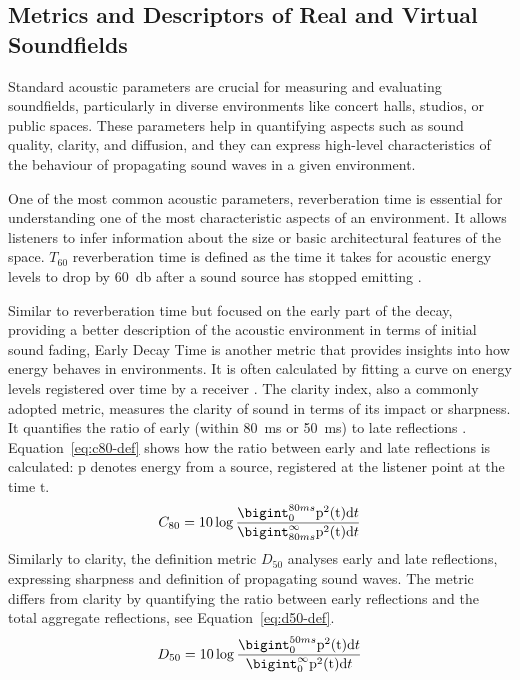 \subsection{Metrics and Descriptors of Real and Virtual Soundfields}
Standard acoustic parameters are crucial for measuring and evaluating soundfields, particularly in diverse environments like concert halls, studios, or public spaces. These parameters help in quantifying aspects such as sound quality, clarity, and diffusion, and they can express high-level characteristics of the behaviour of propagating sound waves in a given environment.\par
One of the most common acoustic parameters, reverberation time is essential for understanding one of the most characteristic aspects of an environment. It allows listeners to infer information about the size or basic architectural features of the space. $T_{60}$ reverberation time is defined as the time it takes for acoustic energy levels to drop by \qty{60}{\decibel} after a sound source has stopped emitting \citep{eckhardt1923acoustics}.\par
Similar to reverberation time but focused on the early part of the decay, providing a better description of the acoustic environment in terms of initial sound fading, Early Decay Time is another metric that provides insights into how energy behaves in environments. It is often calculated by fitting a curve on energy levels registered over time by a receiver \citep{jordan1970acoustical}.
The clarity index, also a commonly adopted metric, measures the clarity of sound in terms of its impact or sharpness.  It quantifies the ratio of early (within \qty{80}{\ms} or \qty{50}{\ms}) to late reflections \citep{reichardt1975definition}. Equation~\ref{eq:c80-def} shows how the ratio between early and late reflections is calculated: $\mathrm{p}$ denotes energy from a source, registered at the listener point at the time $\mathrm{t}$.
\begin{equation}\label{eq:c80-def}
    C_{80} = 10 \log \frac{\bigint_{0}^{80ms}\mathrm{p^2(t)d}t}{\bigint_{80ms}^{\infty}\mathrm{p^2(t)d}t}
\end{equation}
Similarly to clarity, the definition metric $D_{50}$ analyses early and late reflections, expressing sharpness and definition of propagating sound waves. The metric differs from clarity by quantifying the ratio between early reflections and the total aggregate reflections, see Equation~\ref{eq:d50-def}.
\begin{equation}\label{eq:d50-def}
    D_{50} = 10 \log \frac{\bigint_{0}^{50ms}\mathrm{p^2(t)d}t}{\bigint_{0}^{\infty}\mathrm{p^2(t)d}t}
\end{equation}
